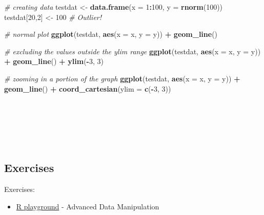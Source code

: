 \documentclass[
]{article}
\newenvironment{Shaded}{\begin{snugshade}}{\end{snugshade}}
\newcommand{\AttributeTok}[1]{\textcolor[rgb]{0.13,0.29,0.53}{#1}}
\newcommand{\CommentTok}[1]{\textcolor[rgb]{0.56,0.35,0.01}{\textit{#1}}}
\newcommand{\DecValTok}[1]{\textcolor[rgb]{0.00,0.00,0.81}{#1}}
\newcommand{\FunctionTok}[1]{\textcolor[rgb]{0.13,0.29,0.53}{\textbf{#1}}}
\newcommand{\NormalTok}[1]{#1}
\newcommand{\OtherTok}[1]{\textcolor[rgb]{0.56,0.35,0.01}{#1}}
\newcommand{\SpecialCharTok}[1]{\textcolor[rgb]{0.81,0.36,0.00}{\textbf{#1}}}
\providecommand{\tightlist}{%
  \setlength{\itemsep}{0pt}\setlength{\parskip}{0pt}}
\begin{document}
\begin{Shaded}
\begin{Highlighting}[]
\CommentTok{\# creating data}
\NormalTok{testdat }\OtherTok{\textless{}{-}} \FunctionTok{data.frame}\NormalTok{(}\AttributeTok{x =} \DecValTok{1}\SpecialCharTok{:}\DecValTok{100}\NormalTok{, }
                      \AttributeTok{y =} \FunctionTok{rnorm}\NormalTok{(}\DecValTok{100}\NormalTok{))}
\NormalTok{testdat[}\DecValTok{20}\NormalTok{,}\DecValTok{2}\NormalTok{] }\OtherTok{\textless{}{-}} \DecValTok{100}  \CommentTok{\# Outlier!}

\CommentTok{\# normal plot}
\FunctionTok{ggplot}\NormalTok{(testdat, }\FunctionTok{aes}\NormalTok{(}\AttributeTok{x =}\NormalTok{ x, }\AttributeTok{y =}\NormalTok{ y)) }\SpecialCharTok{+} 
        \FunctionTok{geom\_line}\NormalTok{()}

\CommentTok{\# excluding the values outside the ylim range}
\FunctionTok{ggplot}\NormalTok{(testdat, }\FunctionTok{aes}\NormalTok{(}\AttributeTok{x =}\NormalTok{ x, }\AttributeTok{y =}\NormalTok{ y)) }\SpecialCharTok{+} 
        \FunctionTok{geom\_line}\NormalTok{() }\SpecialCharTok{+} 
        \FunctionTok{ylim}\NormalTok{(}\SpecialCharTok{{-}}\DecValTok{3}\NormalTok{, }\DecValTok{3}\NormalTok{)}

\CommentTok{\# zooming in a portion of the graph}
\FunctionTok{ggplot}\NormalTok{(testdat, }\FunctionTok{aes}\NormalTok{(}\AttributeTok{x =}\NormalTok{ x, }\AttributeTok{y =}\NormalTok{ y)) }\SpecialCharTok{+} 
        \FunctionTok{geom\_line}\NormalTok{() }\SpecialCharTok{+} 
        \FunctionTok{coord\_cartesian}\NormalTok{(}\AttributeTok{ylim =} \FunctionTok{c}\NormalTok{(}\SpecialCharTok{{-}}\DecValTok{3}\NormalTok{, }\DecValTok{3}\NormalTok{))}
\end{Highlighting}
\end{Shaded}

~

~

~

\hypertarget{exercises-1}{%
\subsection{Exercises}\label{exercises-1}}

Exercises:

\begin{itemize}
\tightlist
\item
  \href{https://federicoroscioli.shinyapps.io/exercises/}{R playground} -
  Advanced Data Manipulation
\end{itemize}
\end{document}
